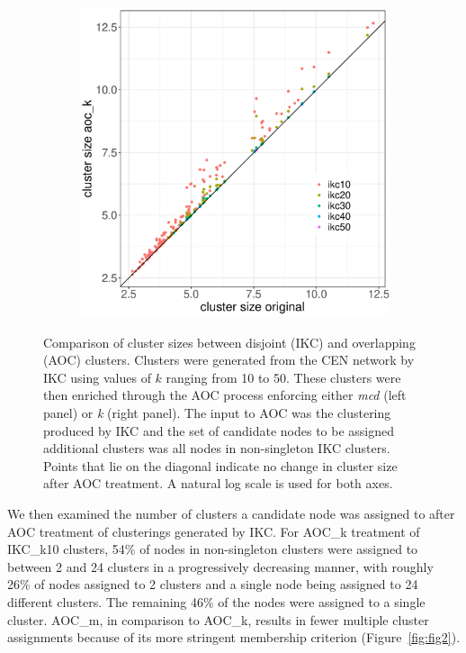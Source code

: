 \documentclass[12pt, oneside]{article}   	%
\begin{document}
{\begin{figure}[H]
\begin{subfigure}[t]{0.48\textwidth}
\includegraphics[width=\linewidth]{fig1a.pdf} 
\end{subfigure}
\captionsetup{width=0.9\textwidth}	
\caption{Comparison of cluster sizes between disjoint (IKC)  and overlapping (AOC) clusters. Clusters were generated from the CEN network by IKC using values of $k$ ranging from 10 to 50. These clusters were then enriched through the AOC process enforcing either \emph{mcd} (left panel) or \emph{k} (right panel). The input to AOC was the  clustering produced by 
IKC and the set of candidate nodes to be assigned additional clusters was all nodes in non-singleton IKC clusters.  Points that lie on the diagonal indicate no change in cluster size after AOC treatment. A natural log scale is used for both axes.}
\label{fig:fig1}
\end{figure}
	
We then examined the number of clusters a candidate node was assigned to after AOC treatment of clusterings generated by  IKC. For AOC\_k treatment of IKC\_k10 clusters, 54\% of nodes in non-singleton clusters were assigned to between 2 and 24 clusters in a progressively decreasing manner, with roughly 26\% of nodes assigned to 2 clusters and a single node being assigned to 24 different clusters.  The remaining 46\% of the nodes were assigned to a single cluster. AOC\_m, in comparison to AOC\_k, results in fewer multiple cluster assignments because of its more stringent membership criterion (Figure~\ref{fig:fig2}).
	
}
\end{document}
